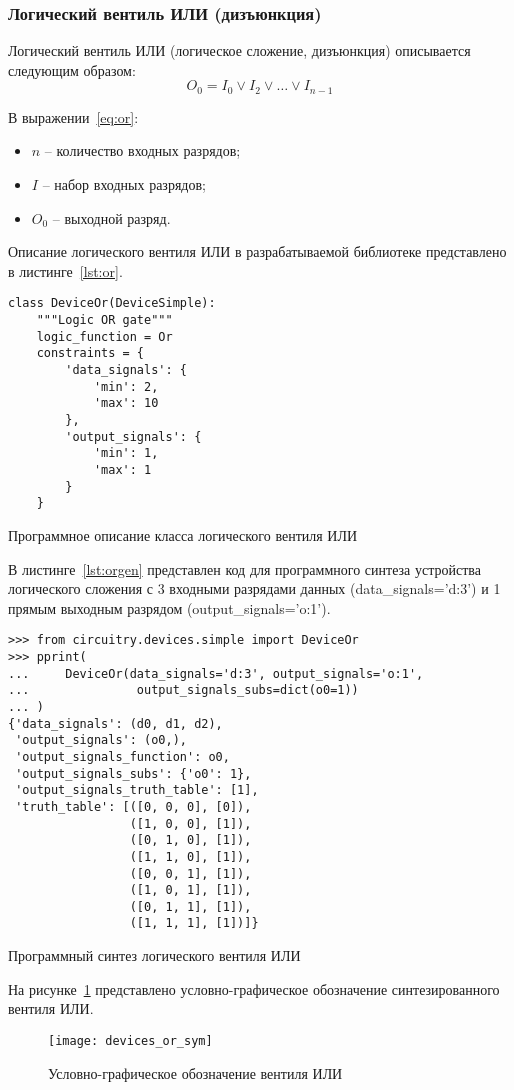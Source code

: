 \documentclass[document.tex]{subfiles}
\begin{document}
\clearpage
\subsubsection{Логический вентиль ИЛИ (дизъюнкция)}
Логический вентиль ИЛИ (логическое сложение, дизъюнкция) описывается следующим
образом:
\begin{equation}
\label{eq:or}
O_0 = I_0 \vee I_2 \vee \ldots \vee I_{n - 1}
\end{equation}

В выражении~\ref{eq:or}:
\begin{itemize}[noitemsep]
  \item $n$ -- количество входных разрядов;
  \item $I$ -- набор входных разрядов;
  \item $O_0$ -- выходной разряд.
\end{itemize}

Описание логического вентиля ИЛИ в разрабатываемой библиотеке представлено в
листинге~\ref{lst:or}.

\begin{listing}[ht]
\begin{verbatim}
class DeviceOr(DeviceSimple):
    """Logic OR gate"""
    logic_function = Or
    constraints = {
        'data_signals': {
            'min': 2,
            'max': 10
        },
        'output_signals': {
            'min': 1,
            'max': 1
        }
    }
\end{verbatim}
\caption{Программное описание класса логического вентиля ИЛИ}
\label{lst:or}
\end{listing}

\clearpage
В листинге~\ref{lst:orgen} представлен код для программного синтеза
устройства логического сложения с 3 входными разрядами данных
(data\_signals='d:3') и 1 прямым выходным разрядом (output\_signals='o:1').

\begin{listing}[ht]
\begin{verbatim}
>>> from circuitry.devices.simple import DeviceOr 
>>> pprint(                                                
...     DeviceOr(data_signals='d:3', output_signals='o:1',
...               output_signals_subs=dict(o0=1))         
... )
{'data_signals': (d0, d1, d2),
 'output_signals': (o0,),
 'output_signals_function': o0,
 'output_signals_subs': {'o0': 1},
 'output_signals_truth_table': [1],
 'truth_table': [([0, 0, 0], [0]),
                 ([1, 0, 0], [1]),
                 ([0, 1, 0], [1]),
                 ([1, 1, 0], [1]),
                 ([0, 0, 1], [1]),
                 ([1, 0, 1], [1]),
                 ([0, 1, 1], [1]),
                 ([1, 1, 1], [1])]}
\end{verbatim}
\caption{Программный синтез логического вентиля ИЛИ}
\label{lst:orgen}
\end{listing}

На рисунке~\ref{fig:deviceor} представлено условно-графическое обозначение
синтезированного вентиля ИЛИ.

\begin{figure}[here]
\centering
\texttt{[image: devices\_or\_sym]}
\caption{Условно-графическое обозначение вентиля ИЛИ}
\label{fig:deviceor}
\end{figure}
\end{document}
